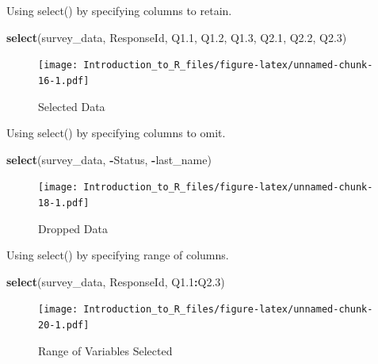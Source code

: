 \documentclass[]{book}
\newenvironment{Shaded}{\begin{snugshade}}{\end{snugshade}}
\newcommand{\FloatTok}[1]{\textcolor[rgb]{0.00,0.00,0.81}{#1}}
\newcommand{\KeywordTok}[1]{\textcolor[rgb]{0.13,0.29,0.53}{\textbf{#1}}}
\newcommand{\NormalTok}[1]{#1}
\newcommand{\OperatorTok}[1]{\textcolor[rgb]{0.81,0.36,0.00}{\textbf{#1}}}
\theoremstyle{definition}
\theoremstyle{definition}
\theoremstyle{definition}
\theoremstyle{remark}
\let\BeginKnitrBlock\begin \let\EndKnitrBlock\end
\begin{document}
\BeginKnitrBlock{example}
\protect\hypertarget{exm:select1}{}{\label{exm:select1} }Using select() by specifying columns to retain.
\EndKnitrBlock{example}

\begin{Shaded}
\begin{Highlighting}[]
\KeywordTok{select}\NormalTok{(survey_data, ResponseId, Q1}\FloatTok{.1}\NormalTok{, Q1}\FloatTok{.2}\NormalTok{, Q1}\FloatTok{.3}\NormalTok{, Q2}\FloatTok{.1}\NormalTok{, Q2}\FloatTok{.2}\NormalTok{, Q2}\FloatTok{.3}\NormalTok{)}
\end{Highlighting}
\end{Shaded}

\begin{figure}
\centering
\texttt{[image: Introduction\_to\_R\_files/figure-latex/unnamed-chunk-16-1.pdf]}
\caption{\label{fig:unnamed-chunk-16}Selected Data}
\end{figure}

\BeginKnitrBlock{example}
\protect\hypertarget{exm:select2}{}{\label{exm:select2} }Using select() by specifying columns to omit.
\EndKnitrBlock{example}

\begin{Shaded}
\begin{Highlighting}[]
\KeywordTok{select}\NormalTok{(survey_data, }\OperatorTok{-}\NormalTok{Status, }\OperatorTok{-}\NormalTok{last_name)}
\end{Highlighting}
\end{Shaded}

\begin{figure}
\centering
\texttt{[image: Introduction\_to\_R\_files/figure-latex/unnamed-chunk-18-1.pdf]}
\caption{\label{fig:unnamed-chunk-18}Dropped Data}
\end{figure}

\BeginKnitrBlock{example}
\protect\hypertarget{exm:select3}{}{\label{exm:select3} }Using select() by specifying range of columns.
\EndKnitrBlock{example}

\begin{Shaded}
\begin{Highlighting}[]
\KeywordTok{select}\NormalTok{(survey_data, ResponseId, Q1}\FloatTok{.1}\OperatorTok{:}\NormalTok{Q2}\FloatTok{.3}\NormalTok{)}
\end{Highlighting}
\end{Shaded}

\begin{figure}
\centering
\texttt{[image: Introduction\_to\_R\_files/figure-latex/unnamed-chunk-20-1.pdf]}
\caption{\label{fig:unnamed-chunk-20}Range of Variables Selected}
\end{figure}
\end{document}
